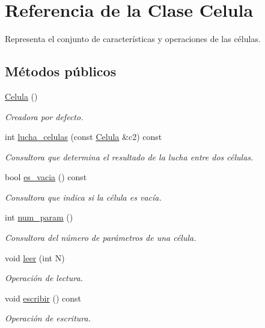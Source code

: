 \hypertarget{class_celula}{\section{Referencia de la Clase Celula}
\label{class_celula}
}


Representa el conjunto de características y operaciones de las células.  


\subsection*{Métodos públicos}
\begin{DoxyCompactItemize}
\item 
\hyperlink{class_celula_a3c5017fbcec8cb564acc666aa7e21206}{Celula} ()
\begin{DoxyCompactList}\small\item\em Creadora por defecto. \end{DoxyCompactList}\item 
int \hyperlink{class_celula_a3dd8be98f1548b02696e2fc32b8d19b4}{lucha\+\_\+celulas} (const \hyperlink{class_celula}{Celula} \&c2) const 
\begin{DoxyCompactList}\small\item\em Consultora que determina el resultado de la lucha entre dos células. \end{DoxyCompactList}\item 
bool \hyperlink{class_celula_a4e97c60a207191b2cc951ccdf245df4b}{es\+\_\+vacia} () const 
\begin{DoxyCompactList}\small\item\em Consultora que indica si la célula es vacía. \end{DoxyCompactList}\item 
int \hyperlink{class_celula_a872a679a68e462dabde1ea4fe5fbc0ad}{num\+\_\+param} ()
\begin{DoxyCompactList}\small\item\em Consultora del número de parámetros de una célula. \end{DoxyCompactList}\item 
void \hyperlink{class_celula_a5124ea0c0da24dfc295dcc428652ee43}{leer} (int N)
\begin{DoxyCompactList}\small\item\em Operación de lectura. \end{DoxyCompactList}\item 
void \hyperlink{class_celula_ae16a94d28e49affafd260405414f37ad}{escribir} () const 
\begin{DoxyCompactList}\small\item\em Operación de escritura. \end{DoxyCompactList}\end{DoxyCompactItemize}
